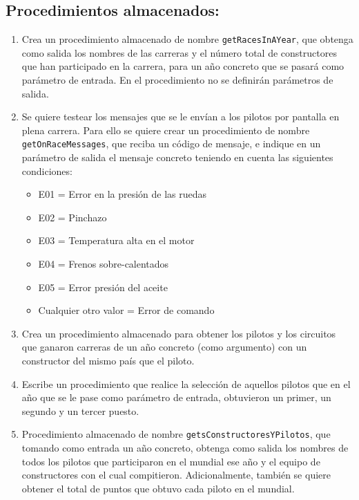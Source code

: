 \documentclass{db-practice}
\begin{document}
\subsection*{Procedimientos almacenados:}

\begin{enumerate}
    \item Crea un procedimiento almacenado de nombre \texttt{getRacesInAYear}, que obtenga como salida los nombres de las carreras y el número total de constructores que han participado en la carrera, para un año concreto que se pasará como parámetro de entrada. En el procedimiento no se definirán parámetros de salida.  
        
    \item Se quiere testear los mensajes que se le envían a los pilotos por pantalla en plena carrera. Para ello se quiere crear un procedimiento de nombre \texttt{getOnRaceMessages}, que reciba un código de mensaje, e indique en un parámetro de salida el mensaje concreto teniendo en cuenta las siguientes condiciones:
    \begin{itemize}
        \item E01 = Error en la presión de las ruedas
        \item E02 = Pinchazo
        \item E03 = Temperatura alta en el motor
        \item E04 = Frenos sobre-calentados
        \item E05 = Error presión del aceite
        \item Cualquier otro valor = Error de comando
    \end{itemize} 

    \item Crea un procedimiento almacenado para obtener los pilotos y los circuitos que ganaron carreras de un año concreto (como argumento) con un constructor del mismo país que el piloto.

    \item Escribe un procedimiento que realice la selección de aquellos pilotos que en el año que se le pase como parámetro de entrada, obtuvieron un primer, un segundo y un tercer puesto.
    
    \item Procedimiento almacenado de nombre \texttt{getsConstructoresYPilotos}, que tomando como entrada un año concreto, obtenga como salida los nombres de todos los pilotos que participaron en el mundial ese año y el equipo de constructores con el cual compitieron. Adicionalmente, también se quiere obtener el total de puntos que obtuvo cada piloto en el mundial.


\end{enumerate}
\end{document}
